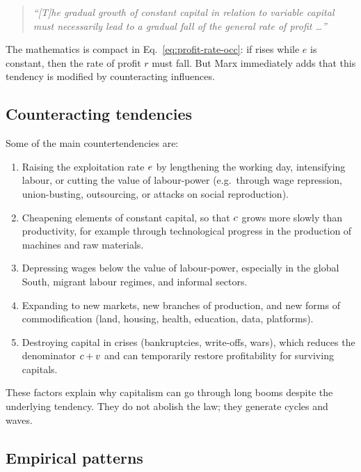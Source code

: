 \begin{quote}
\emph{``[T]he gradual growth of constant capital in relation to variable capital must necessarily lead to a
gradual fall of the general rate of profit \dots''}\cite{Marx1894}
\end{quote}


The mathematics is compact in Eq.~\eqref{eq:profit-rate-occ}: if \OCC{} rises while $e$ is constant, then the rate of profit $r$ must fall. But Marx immediately adds that this tendency is modified by counteracting influences.

\subsection{Counteracting tendencies}

Some of the main countertendencies are:

\begin{enumerate}[leftmargin=1.5em]
  \item Raising the exploitation rate $e$ by lengthening the
  working day, intensifying labour, or cutting the value of labour-power
  (e.g.\ through wage repression, union-busting, outsourcing, or attacks on
  social reproduction).\cite{HarveyCompanion}

  \item Cheapening elements of constant capital, so that $c$ grows
  more slowly than productivity, for example through technological progress
  in the production of machines and raw materials.

  \item Depressing wages below the value of labour-power, especially in the
  global South, migrant labour regimes, and informal sectors.

  \item Expanding to new markets, new branches of production, and new forms
  of commodification (land, housing, health, education, data, platforms).

  \item Destroying capital in crises (bankruptcies, write-offs, wars), which
  reduces the denominator $c + v$ and can temporarily restore
  profitability for surviving capitals.
\end{enumerate}

These factors explain why capitalism can go through long booms despite the
underlying tendency. They do not abolish the law; they generate cycles and
waves.

\subsection{Empirical patterns}

